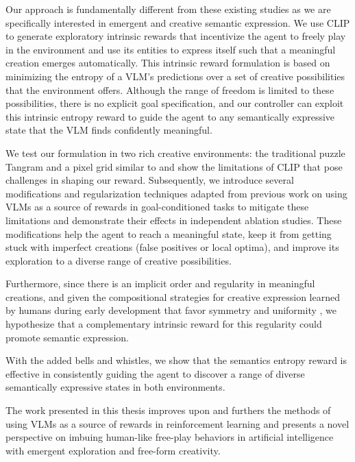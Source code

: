 Our approach is fundamentally different from these existing studies as we are specifically interested in emergent and creative semantic expression.
We use CLIP to generate exploratory intrinsic rewards that incentivize the agent to freely play in the environment and use its entities to express itself such that a meaningful creation emerges automatically.
This intrinsic reward formulation is based on minimizing the entropy of a VLM's predictions over a set of creative possibilities that the environment offers.
Although the range of freedom is limited to these possibilities, there is no explicit goal specification,
and our controller can exploit this intrinsic entropy reward to guide the agent to any semantically expressive state that the VLM finds confidently meaningful.

We test our formulation in two rich creative environments: the traditional puzzle Tangram and a pixel grid similar to  and show the limitations of CLIP that pose challenges in shaping our reward.
Subsequently, we introduce several modifications and regularization techniques adapted from previous work on using VLMs as a source of rewards in goal-conditioned tasks to mitigate these limitations and demonstrate their effects in independent ablation studies.
These modifications help the agent to reach a meaningful state, keep it from getting stuck with imperfect creations (false positives or local optima), and improve its exploration to a diverse range of creative possibilities.


Furthermore, since there is an implicit order and regularity in meaningful creations, and given the compositional strategies for creative expression learned by humans during early development that favor symmetry \citep{symmetry} and uniformity \citep{compositional}, we hypothesize that a complementary intrinsic reward for this regularity \citep{rair} could promote semantic expression.

With the added bells and whistles, we show that the semantics entropy reward is effective in consistently guiding the agent to discover a range of diverse semantically expressive states in both environments.


The work presented in this thesis improves upon and furthers the methods of using VLMs as a source of rewards in reinforcement learning and presents a novel perspective on imbuing human-like free-play behaviors in artificial intelligence with emergent exploration and free-form creativity.
